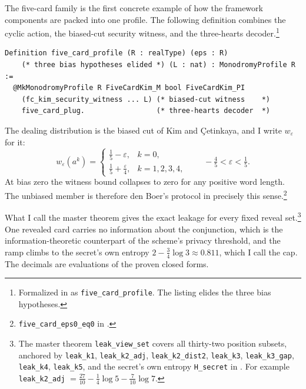 \documentclass[runningheads]{llncs}
\newcommand{\coqin}[1]{\texttt{#1}}
\begin{document}
The five-card family is the first concrete example of how the framework
components are packed into one profile. The following definition combines
the cyclic action, the biased-cut security witness, and the three-hearts
decoder.\footnote{Formalized in
 as
\coqin{five\_card\_profile}. The listing elides the three bias
hypotheses.}

\begin{lstlisting}
Definition five_card_profile (R : realType) (eps : R)
    (* three bias hypotheses elided *) (L : nat) : MonodromyProfile R :=
  @MkMonodromyProfile R FiveCardKim_M bool FiveCardKim_PI
    (fc_kim_security_witness ... L) (* biased-cut witness    *)
    five_card_plug.                 (* three-hearts decoder  *)
\end{lstlisting}

The dealing distribution is the biased cut of Kim and \c{C}etinkaya,
and I write $w_\varepsilon$ for it:
\begin{equation}
  w_\varepsilon(a^k)=\begin{cases}\tfrac{1}{5}-\varepsilon, & k=0,\\[2pt]
  \tfrac{1}{5}+\tfrac{\varepsilon}{4}, & k=1,2,3,4,\end{cases}
  \qquad -\tfrac{4}{5}<\varepsilon<\tfrac{1}{5}.
  \label{eq:fivecard-weight}
\end{equation}
At bias zero the witness bound collapses to zero for any positive word
length. The unbiased member is therefore den Boer's protocol in
precisely this sense.\footnote{\coqin{five\_card\_eps0\_eq0} in
.}

What I call the master theorem gives the exact leakage for every fixed reveal set.\footnote{The master theorem \coqin{leak\_view\_set} covers all
thirty-two position subsets, anchored by \coqin{leak\_k1},
\coqin{leak\_k2\_adj}, \coqin{leak\_k2\_dist2}, \coqin{leak\_k3},
\coqin{leak\_k3\_gap}, \coqin{leak\_k4}, \coqin{leak\_k5}, and the secret's
own entropy \coqin{H\_secret} in
. For example
\coqin{leak\_k2\_adj} $=\tfrac{27}{10}-\tfrac14\log 5-\tfrac{7}{10}\log
7$.} One revealed card carries no information about the conjunction, which
is the information-theoretic counterpart of the scheme's privacy
threshold, and the ramp climbs to the secret's own entropy
$2-\tfrac34\log 3\approx 0.811$, which I call the cap. The decimals are
evaluations of the proven closed forms.
\end{document}
